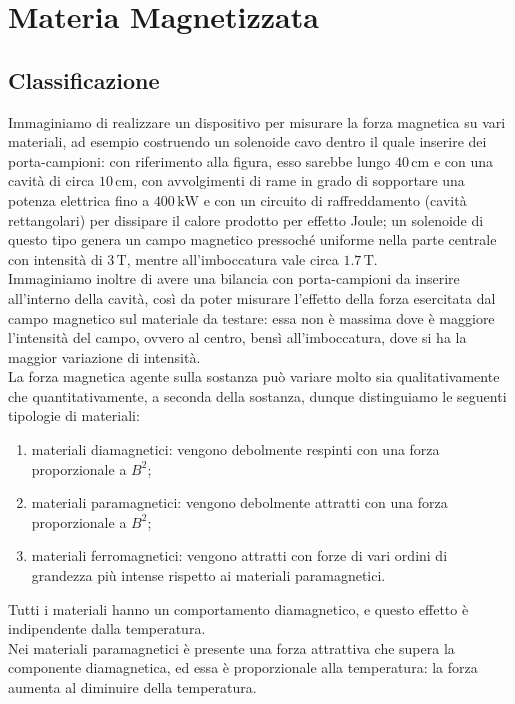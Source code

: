 \documentclass[]{article}
\begin{document}
\section{Materia Magnetizzata}

\subsection{Classificazione}

Immaginiamo di realizzare un dispositivo per misurare la forza magnetica su vari materiali, ad esempio costruendo un solenoide cavo dentro il quale inserire dei porta-campioni: con riferimento alla figura, esso sarebbe lungo $ 40\,\text{cm} $ e con una cavità di circa $ 10\,\text{cm} $, con avvolgimenti di rame in grado di sopportare una potenza elettrica fino a $ 400\,\text{kW} $ e con un circuito di raffreddamento (cavità rettangolari) per dissipare il calore prodotto per effetto Joule; un solenoide di questo tipo genera un campo magnetico pressoché uniforme nella parte centrale con intensità di $ 3\,\text{T} $, mentre all'imboccatura vale circa $ 1.7\,\text{T} $. \\ 
%
Immaginiamo inoltre di avere una bilancia con porta-campioni da inserire all'interno della cavità, così da poter misurare l'effetto della forza esercitata dal campo magnetico sul materiale da testare: essa non è massima dove è maggiore l'intensità del campo, ovvero al centro, bensì all'imboccatura, dove si ha la maggior variazione di intensità. \\ 
%
La forza magnetica agente sulla sostanza può variare molto sia qualitativamente che quantitativamente, a seconda della sostanza, dunque distinguiamo le seguenti tipologie di materiali:
\begin{enumerate}
	\item materiali diamagnetici: vengono debolmente respinti con una forza proporzionale a $ B^2 $;
	\item materiali paramagnetici: vengono debolmente attratti con una forza proporzionale a $ B^2 $;
	\item materiali ferromagnetici: vengono attratti con forze di vari ordini di grandezza più intense rispetto ai materiali paramagnetici. 
\end{enumerate}
Tutti i materiali hanno un comportamento diamagnetico, e questo effetto è indipendente dalla temperatura. \\ 
Nei materiali paramagnetici è presente una forza attrattiva che supera la componente diamagnetica, ed essa è proporzionale alla temperatura: la forza aumenta al diminuire della temperatura. \\ 
\end{document}
